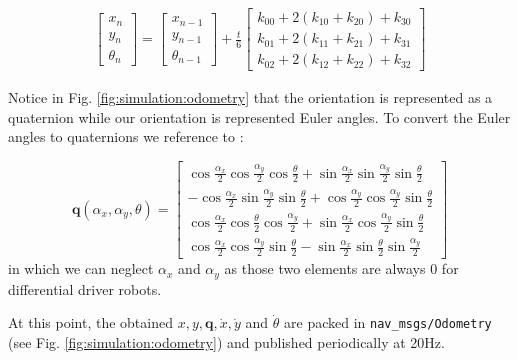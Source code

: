 \begin{equation}
\begin{aligned}
    \begin{bmatrix}
        x_n \\
        y_n \\
        \theta_n
    \end{bmatrix} = \begin{bmatrix}
        x_{n-1} \\
        y_{n-1} \\
        \theta_{n-1}
    \end{bmatrix} + \frac{t}{6}
    \begin{bmatrix}
        k_{00} + 2 (k_{10} + k_{20}) + k_{30} \\
        k_{01} + 2 (k_{11} + k_{21}) + k_{31} \\
        k_{02} + 2 (k_{12} + k_{22}) + k_{32}
    \end{bmatrix} 
\end{aligned}
\end{equation}

Notice in Fig. \ref{fig:simulation:odometry} that the orientation is represented as a quaternion while our orientation is represented Euler angles. To convert the Euler angles to quaternions we reference to \cite[p. 12]{diebel_representing_2006}: 

\begin{equation}
    \bm{q}(\alpha_x, \alpha_y, \theta) = \begin{bmatrix}
        \cos{\frac{\alpha_x}{2}} \cos{\frac{\alpha_y}{2}} \cos{\frac{\theta}{2}} + \sin{\frac{\alpha_x}{2}} \sin{\frac{\alpha_y}{2}} \sin{\frac{\theta}{2}} \\
        -\cos{\frac{\alpha_x}{2}} \sin{\frac{\alpha_y}{2}} \sin{\frac{\theta}{2}} + \cos{\frac{\alpha_y}{2}} \cos{\frac{\alpha_y}{2}} \sin{\frac{\theta}{2}} \\
        \cos{\frac{\alpha_x}{2}} \cos{\frac{\theta}{2}} \cos{\frac{\alpha_y}{2}} + \sin{\frac{\alpha_x}{2}} \cos{\frac{\alpha_y}{2}} \sin{\frac{\theta}{2}} \\
        \cos{\frac{\alpha_x}{2}} \cos{\frac{\alpha_y}{2}} \sin{\frac{\theta}{2}} - \sin{\frac{\alpha_x}{2}} \sin{\frac{\theta}{2}} \sin{\frac{\alpha_y}{2}}
    \end{bmatrix}
\end{equation}
in which we can neglect $ \alpha_x $ and $ \alpha_y $ as those two elements are always 0 for differential driver robots.

At this point, the obtained $ x, y, \bm{q}, \dot{x}, \dot{y} $ and $ \dot{\theta} $ are packed in \texttt{nav\_msgs/Odometry} (see Fig. \ref{fig:simulation:odometry}) and published periodically at 20Hz.

